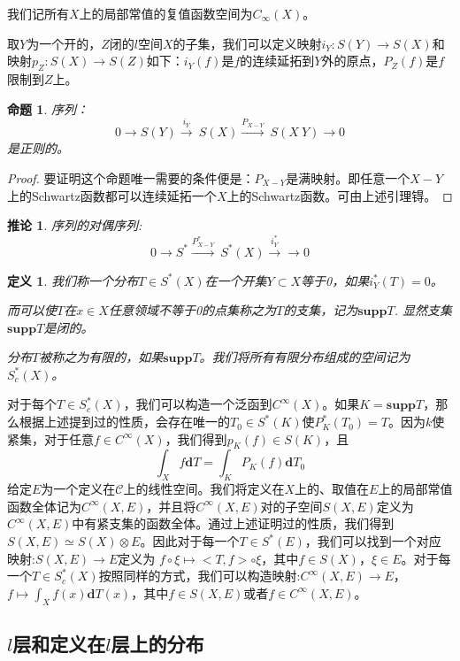 \documentclass{article}
\newtheorem{definition}{定义}
\newtheorem{proposition}{命题}
\newtheorem{corollary}{推论}
\newtheorem{proof}{证明}
\begin{document}
我们记所有$X$上的局部常值的复值函数空间为$C_{\infty}(X)$。

取$Y$为一个开的，$Z$闭的$l$空间$X$的子集，我们可以定义映射$i_{Y}:S(Y)\rightarrow S(X)$和映射$p_{Z}:S(X)\rightarrow S(Z)$如下：$i_{Y}(f)$是$f$的连续延拓到$Y$外的原点，$P_{Z}(f)$是$f$限制到$Z$上。
\begin{proposition}
    序列：$$0\rightarrow S(Y)\xrightarrow{i_{Y}}\ S(X)\xrightarrow{P_{X- Y}}\ S(X\ Y)\rightarrow 0$$
    是正则的。
\end{proposition}
\begin{proof}
要证明这个命题唯一需要的条件便是：$P_{X-Y}$是满映射。即任意一个$X-Y$上的Schwartz函数都可以连续延拓一个$X$上的Schwartz函数。可由上述引理锝。
\end{proof}
\begin{corollary}
序列的对偶序列:
$$0\rightarrow S^{*} \xrightarrow{P^{*}_{X-Y}}\ S^{*}(X)\xrightarrow{i^{*}_{Y}}\rightarrow 0$$
\end{corollary}

\begin{definition}
我们称一个分布$T\in S^{*}(X)$在一个开集$Y\subset X$等于0，如果$i^{*}_{Y}(T)=0$。

而可以使$T$在$x\in X$任意领域不等于0的点集称之为$T$的支集，记为$\mathbf{supp} T$. 显然支集$\mathbf{supp} T$是闭的。

分布$T$被称之为有限的，如果$\mathbf{supp} T$。我们将所有有限分布组成的空间记为$S^{*}_{c}(X)$。
\end{definition}
对于每个$T\in S_{c}^{*}(X)$，我们可以构造一个泛函到$C^{\infty}(X)$。如果$K=\mathbf{supp}T$，那么根据上述提到过的性质，会存在唯一的$T_{0}\in S^{*}(K)$使$P^{*}_{K}(T_{0})=T$。因为$k$使紧集，对于任意$f\in C^{\infty}(X)$，我们得到$p_{K}(f)\in S(K)$，且
$$\int_{X}f\mathbf{d}T=\int_{K}P_{K}(f)\mathbf{d}T_{0}$$
给定$E$为一个定义在$\mathcal{C}$上的线性空间。我们将定义在$X$上的、取值在$E$上的局部常值函数全体记为$C^{\infty}(X,E)$，并且将$C^{\infty}(X,E)$对的子空间$S(X,E)$定义为$C^{\infty}(X,E)$中有紧支集的函数全体。通过上述证明过的性质，我们得到$S(X,E)\simeq S(X)\otimes E$。因此对于每一个$T\in S^{*}(E)$，我们可以找到一个对应映射:$S(X,E)\rightarrow E$定义为 $f\circ \xi\mapsto<T,f>\circ \xi$，其中$f\in S(X)$，$\xi\in E$。对于每一个$T\in S^{*}_{c}(X)$按照同样的方式，我们可以构造映射:$C^{\infty}(X,E)\rightarrow E$，$f\mapsto \int_{X}f(x)\mathbf{d}T(x)$，其中$f\in S(X,E)$或者$f\in C^{\infty}(X,E)$。




\subsection{$l$层和定义在$l$层上的分布}
\end{document}
